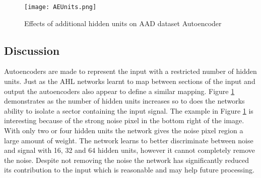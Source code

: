 \begin{figure}[h]
    \centering
    \texttt{[image: AEUnits.png]}
    \caption{Effects of additional hidden units on AAD dataset Autoencoder}
    \label{fig:AEUnits}
\end{figure}


\subsection{Discussion}
Autoencoders are made to represent the input with a restricted number of hidden units.
Just as the AHL networks learnt to map between sections of the input and output the autoencoders also appear to define a similar mapping. 
Figure \ref{fig:AEUnits} demonstrates as the number of hidden units increases so to does the networks ability to isolate a sector containing the input signal.
The example in Figure \ref{fig:AEUnits} is interesting because of the strong noise pixel in the bottom right of the image. 
With only two or four hidden units the network gives the noise pixel region a large amount of weight.
The network learns to better discriminate between noise and signal with 16, 32 and 64 hidden units, however it cannot completely remove the noise.
Despite not removing the noise the network has significantly reduced its contribution to the input which is reasonable and may help future processing. 
